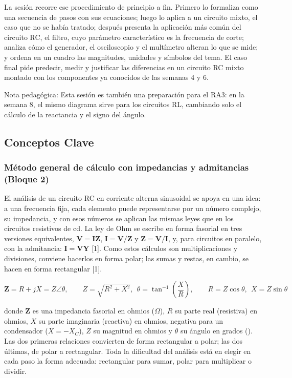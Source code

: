 \documentclass[11pt,letterpaper]{article}
\begin{document}
La sesión recorre ese procedimiento de principio a fin. Primero lo formaliza como una secuencia de pasos con sus ecuaciones; luego lo aplica a un circuito mixto, el caso que no se había tratado; después presenta la aplicación más común del circuito RC, el filtro, cuyo parámetro característico es la frecuencia de corte; analiza cómo el generador, el osciloscopio y el multímetro alteran lo que se mide; y ordena en un cuadro las magnitudes, unidades y símbolos del tema. El caso final pide predecir, medir y justificar las diferencias en un circuito RC mixto montado con los componentes ya conocidos de las semanas 4 y 6.

\begin{nota}{Nota pedagógica:}
Esta sesión es también una preparación para el RA3: en la semana 8, el mismo diagrama sirve para los circuitos RL, cambiando solo el cálculo de la reactancia y el signo del ángulo.
\end{nota}

\subsection{Conceptos Clave}

\subsubsection{Método general de cálculo con impedancias y admitancias (Bloque 2)}

El análisis de un circuito RC en corriente alterna sinusoidal se apoya en una idea: a una frecuencia fija, cada elemento puede representarse por un número complejo, su impedancia, y con esos números se aplican las mismas leyes que en los circuitos resistivos de cd. La ley de Ohm se escribe en forma fasorial en tres versiones equivalentes, $\mathbf{V} = \mathbf{I}\mathbf{Z}$, $\mathbf{I} = \mathbf{V}/\mathbf{Z}$ y $\mathbf{Z} = \mathbf{V}/\mathbf{I}$, y, para circuitos en paralelo, con la admitancia: $\mathbf{I} = \mathbf{V}\mathbf{Y}$ [1]. Como estos cálculos son multiplicaciones y divisiones, conviene hacerlos en forma polar; las sumas y restas, en cambio, se hacen en forma rectangular [1].

\begin{equation}
  \mathbf{Z} = R + jX = Z\angle\theta, \qquad Z = \sqrt{R^{2} + X^{2}},\ \ \theta = \tan^{-1}\!\left(\frac{X}{R}\right), \qquad R = Z\cos\theta,\ \ X = Z\sin\theta
\end{equation}

donde $\mathbf{Z}$ es una impedancia fasorial en ohmios (\ensuremath{\Omega}), $R$ su parte real (resistiva) en ohmios, $X$ su parte imaginaria (reactiva) en ohmios, negativa para un condensador ($X = -X_C$), $Z$ su magnitud en ohmios y $\theta$ su ángulo en grados (\textdegree{}). Las dos primeras relaciones convierten de forma rectangular a polar; las dos últimas, de polar a rectangular. Toda la dificultad del análisis está en elegir en cada paso la forma adecuada: rectangular para sumar, polar para multiplicar o dividir.
\end{document}

